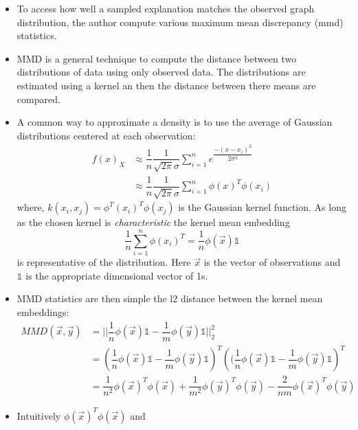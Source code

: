 \documentclass[
  11pt,
  letterpaper,
]{article}
\begin{document}
\begin{itemize}
  \begin{itemize}
  \item
    To access how well a sampled explanation matches the observed graph
    distribution, the author compute various maximum mean discrepancy
    (mmd) statistics.
  \item
    MMD is a general technique to compute the distance between two
    distributions of data using only observed data. The distributions
    are estimated using a kernel an then the distance between there
    means are compared.
  \item
    A common way to approximate a density is to use the average of
    Gaussian distributions centered at each observation: \begin{align*}
      f(x)_X 
          &\approx \dfrac 1 n \dfrac{1}{\sqrt{2\pi}\sigma} 
          \sum_{i = 1}^n e^{\dfrac{-(x - x_i)^2}{2\sigma^2}} \\
          &\approx \dfrac 1 n \dfrac{1}{\sqrt{2\pi}\sigma} 
          \sum_{i = 1}^n \phi(x)^T \phi(x_i) 
      \end{align*} where, \(k(x_i, x_j) = \phi^T(x_i)^T \phi(x_j)\) is
    the Gaussian kernel function. As long as the chosen kernel is
    \emph{characteristic} the kernel mean embedding \[
      \dfrac 1 n \sum_{i = 1}^n \phi(x_i)^T = 
          \dfrac{1}{n} \phi(\vec{x}) \mathbb{1}
      \] is representative of the distribution. Here \(\vec x\) is the
    vector of observations and \(\mathbb{1}\) is the appropriate
    dimensional vector of 1s.
  \item
    MMD statistics are then simple the l2 distance between the kernel
    mean embeddings: \begin{align*}
       MMD(\vec x, \vec y) 
          &= 
          || 
          \dfrac{1}{n} \phi(\vec{x}) \mathbb{1} - 
          \dfrac{1}{m} \phi(\vec{y}) \mathbb{1}
          ||^2_2 \\
          &= 
          \left(
              \dfrac{1}{n} \phi(\vec{x}) \mathbb{1} -
              \dfrac{1}{m} \phi(\vec{y}) \mathbb{1}
          \right)^T
          \left(
              (\dfrac{1}{n} \phi(\vec{x}) \mathbb{1} -
              \dfrac{1}{m} \phi(\vec{y}) \mathbb{1}
          \right)^T \\
          &= 
          \dfrac{1}{n^2} \phi(\vec{x})^T \phi(\vec{x}) + 
          \dfrac{1}{m^2} \phi(\vec{y})^T \phi(\vec{y}) - 
          \dfrac{2}{nm} \phi(\vec{x})^T \phi(\vec{y})
      \end{align*}
  \item
    Intuitively \(\phi(\vec{x})^T \phi(\vec{x})\) and

\end{itemize}
\end{itemize}
\end{document}
